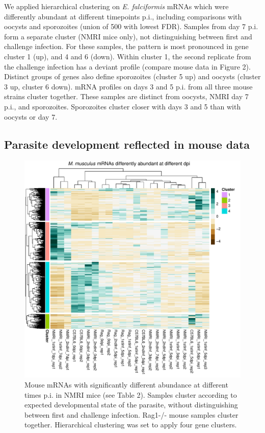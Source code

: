 \documentclass{bmcart}
\begin{document}
We applied hierarchical clustering on \textit{E. falciformis} mRNAs which were differently abundant at different timepoints p.i., including comparisons with oocysts and sporozoites (union of 500 with lowest FDR). Samples from day 7 p.i. form a separate cluster (NMRI mice only), not distinguishing between first and challenge infection. For these samples, the pattern is most pronounced in gene cluster 1 (up), and 4 and 6 (down). Within cluster 1, the second replicate from the challenge infection has a deviant profile (compare mouse data in Figure 2). Distinct groups of genes also define sporozoites (cluster 5 up) and oocysts (cluster 3 up, cluster 6 down). mRNA profiles on days 3 and 5 p.i. from all three mouse strains cluster together. These samples are distinct from oocysts, NMRI day 7 p.i., and sporozoites. Sporozoites cluster closer with days 3 and 5 than with oocysts or day 7.


\clearpage
\subsection{Parasite development reflected in mouse data}
\begin{figure}[h!]
\includegraphics[width=\linewidth]{MmLifecycleHeatmap.pdf}  
\caption{Mouse mRNAs with significantly different abundance at different times p.i. in NMRI mice (see Table 2). Samples cluster according to expected developmental state of the parasite, without distinguishing between first and challenge infection. Rag1-/- mouse samples cluster together. Hierarchical clustering was set to apply four gene clusters.}
\end{figure}
\end{document}
